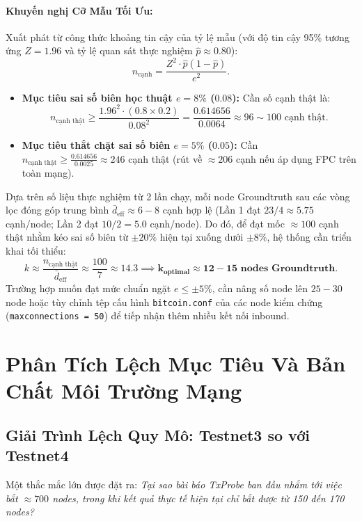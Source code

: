 \documentclass[11pt,a4paper]{article}
\begin{document}
\paragraph{Khuyến nghị Cỡ Mẫu Tối Ưu:} Xuất phát từ công thức khoảng tin cậy của tỷ lệ mẫu (với độ tin cậy 95\% tương ứng $Z = 1.96$ và tỷ lệ quan sát thực nghiệm $\hat{p} \approx 0.80$):
\begin{equation}
    n_{\text{cạnh}} = \frac{Z^2 \cdot \hat{p}(1 - \hat{p})}{e^2}.
\end{equation}
\begin{itemize}
    \item \textbf{Mục tiêu sai số biên học thuật $e = 8\%$ ($0.08$):} Cần số cạnh thật là:
    \begin{equation}
        n_{\text{cạnh thật}} \ge \frac{1.96^2 \cdot (0.8 \times 0.2)}{0.08^2} = \frac{0.614656}{0.0064} \approx 96 \sim 100 \text{ cạnh thật}.
    \end{equation}
    \item \textbf{Mục tiêu thắt chặt sai số biên $e = 5\%$ ($0.05$):} Cần $n_{\text{cạnh thật}} \ge \frac{0.614656}{0.0025} \approx 246$ cạnh thật (rút về $\approx 206$ cạnh nếu áp dụng FPC trên toàn mạng).
\end{itemize}
Dựa trên số liệu thực nghiệm từ 2 lần chạy, mỗi node Groundtruth sau các vòng lọc đóng góp trung bình $\bar{d}_{\text{eff}} \approx 6 - 8$ cạnh hợp lệ (Lần 1 đạt $23/4 \approx 5.75$ cạnh/node; Lần 2 đạt $10/2 = 5.0$ cạnh/node). Do đó, để đạt mốc $\approx 100$ cạnh thật nhằm kéo sai số biên từ $\pm 20\%$ hiện tại xuống dưới $\pm 8\%$, hệ thống cần triển khai tối thiểu:
\begin{equation}
    k \approx \frac{n_{\text{cạnh thật}}}{\bar{d}_{\text{eff}}} \approx \frac{100}{7} \approx 14.3 \implies \mathbf{k_{\text{optimal}} \approx 12 - 15 \text{ nodes Groundtruth}}.
\end{equation}
Trường hợp muốn đạt mức chuẩn ngặt $e \le \pm 5\%$, cần nâng số node lên $25 - 30$ node hoặc tùy chỉnh tệp cấu hình \texttt{bitcoin.conf} của các node kiểm chứng (\texttt{maxconnections = 50}) để tiếp nhận thêm nhiều kết nối inbound.

\section{Phân Tích Lệch Mục Tiêu Và Bản Chất Môi Trường Mạng}

\subsection{Giải Trình Lệch Quy Mô: Testnet3 so với Testnet4}
Một thắc mắc lớn được đặt ra: \textit{Tại sao bài báo TxProbe ban đầu nhắm tới việc bắt $\approx 700$ nodes, trong khi kết quả thực tế hiện tại chỉ bắt được từ 150 đến 170 nodes?}
\end{document}
